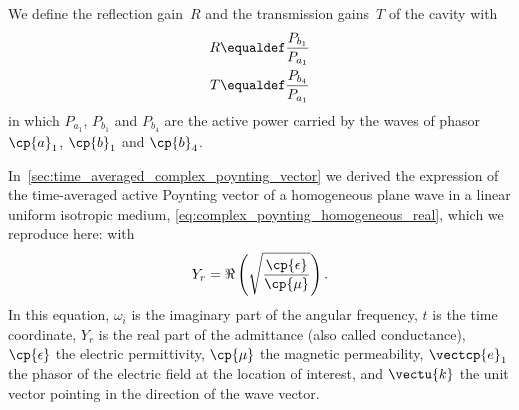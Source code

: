 \begin{refsection}
We define the reflection gain~$R$ and the transmission gains~$T$ of the cavity with
\begin{align}
    R &\equaldef \frac{P_{b_1}}{P_{a_1}} \\
    T &\equaldef \frac{P_{b_4}}{P_{a_1}}
\end{align}
in which $P_{a_1}$, $P_{b_1}$ and $P_{b_4}$ are the active power carried by the waves of phasor $\cp{a}_1$, $\cp{b}_1$ and $\cp{b}_4$.

In~\cref{sec:time_averaged_complex_poynting_vector} we derived the expression of the time-averaged active Poynting vector of a homogeneous plane wave in a linear uniform isotropic medium,
\cref{eq:complex_poynting_homogeneous_real},
which we reproduce here:
with
\begin{equation}
    Y_r = \Re\left( \sqrt{\frac{\cp{\epsilon}}{\cp{\mu}}} \right)
    \text{.}
\end{equation}
In this equation,
$\omega_i$ is the imaginary part of the angular frequency,
$t$ is the time coordinate,
$Y_r$ is the real part of the admittance (also called conductance),
$\cp{\epsilon}$ the electric permittivity,
$\cp{\mu}$ the magnetic permeability,
$\vectcp{e}_1$ the phasor of the electric field at the location of interest, and
$\vectu{k}$ the unit vector pointing in the direction of the wave vector.


\end{refsection}
